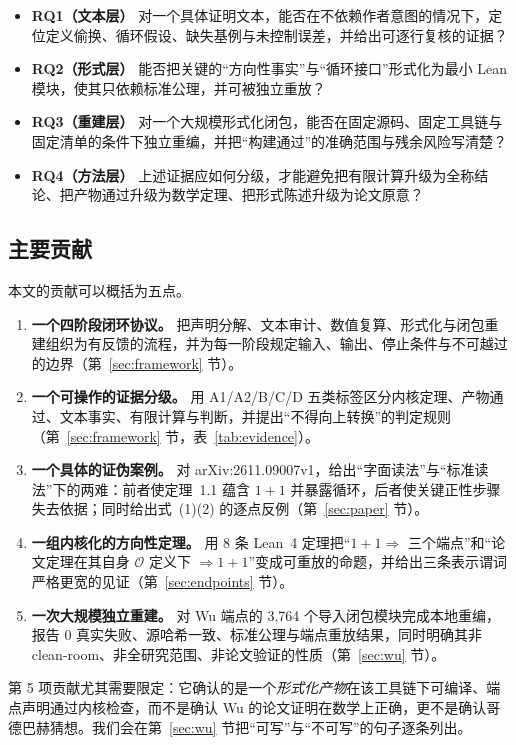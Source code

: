 \documentclass[11pt,a4paper]{ctexart}
\theoremstyle{plain}
\theoremstyle{definition}
\begin{document}
\begin{itemize}
\item \textbf{RQ1（文本层）} 对一个具体证明文本，能否在不依赖作者意图的情况下，定位定义偷换、循环假设、缺失基例与未控制误差，并给出可逐行复核的证据？
\item \textbf{RQ2（形式层）} 能否把关键的“方向性事实”与“循环接口”形式化为最小 Lean 模块，使其只依赖标准公理，并可被独立重放？
\item \textbf{RQ3（重建层）} 对一个大规模形式化闭包，能否在固定源码、固定工具链与固定清单的条件下独立重编，并把“构建通过”的准确范围与残余风险写清楚？
\item \textbf{RQ4（方法层）} 上述证据应如何分级，才能避免把有限计算升级为全称结论、把产物通过升级为数学定理、把形式陈述升级为论文原意？
\end{itemize}

\subsection{主要贡献}
\label{sec:contributions}

本文的贡献可以概括为五点。

\begin{enumerate}
\item \textbf{一个四阶段闭环协议。} 把声明分解、文本审计、数值复算、形式化与闭包重建组织为有反馈的流程，并为每一阶段规定输入、输出、停止条件与不可越过的边界（第~\ref{sec:framework} 节）。
\item \textbf{一个可操作的证据分级。} 用 A1/A2/B/C/D 五类标签区分内核定理、产物通过、文本事实、有限计算与判断，并提出“不得向上转换”的判定规则（第~\ref{sec:framework} 节，表~\ref{tab:evidence}）。
\item \textbf{一个具体的证伪案例。} 对 arXiv:2611.09007v1，给出“字面读法”与“标准读法”下的两难：前者使定理~1.1 蕴含 $1+1$ 并暴露循环，后者使关键正性步骤失去依据；同时给出式~(1)(2) 的逐点反例（第~\ref{sec:paper} 节）。
\item \textbf{一组内核化的方向性定理。} 用 8 条 Lean~4 定理把“$1+1\Rightarrow$ 三个端点”和“论文定理在其自身 $\mathcal O$ 定义下 $\Rightarrow 1+1$”变成可重放的命题，并给出三条表示谓词严格更宽的见证（第~\ref{sec:endpoints} 节）。
\item \textbf{一次大规模独立重建。} 对 Wu 端点的 3,764 个导入闭包模块完成本地重编，报告 0 真实失败、源哈希一致、标准公理与端点重放结果，同时明确其非 clean-room、非全研究范围、非论文验证的性质（第~\ref{sec:wu} 节）。
\end{enumerate}

第 5 项贡献尤其需要限定：它确认的是一个\emph{形式化产物}在该工具链下可编译、端点声明通过内核检查，而不是确认 Wu 的论文证明在数学上正确，更不是确认哥德巴赫猜想。我们会在第~\ref{sec:wu} 节把“可写”与“不可写”的句子逐条列出。
\end{document}
